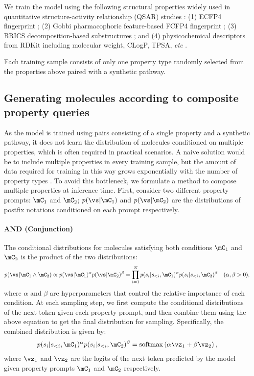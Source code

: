 We train the model using the following structural properties widely used in quantitative structure-activity relationship (QSAR) studies \citep{roy2015qsarbook}:
(1) ECFP4 fingerprint \citep{rogers2010extended};
(2) Gobbi pharmacophoric feature-based FCFP4 fingerprint \citep{gobbi1998genetic};
(3) BRICS decomposition-based substructures \citep{degen2008art}; and
(4) physicochemical descriptors from RDKit including molecular weight, CLogP, TPSA, \textit{etc} \citep{rdkit}.

Each training sample consists of only one property type randomly selected from the properties above paired with a synthetic pathway.


\subsection{Generating molecules according to composite property queries}
\label{sec:method:sampling}

As the model is trained using pairs consisting of a single property and a synthetic pathway, it does not learn the distribution of molecules conditioned on multiple properties, which is often required in practical scenarios.
A naive solution would be to include multiple properties in every training sample, but the amount of data required for training in this way grows exponentially with the number of property types \citep{du2024position}.
To avoid this bottleneck, we formulate a method to compose multiple properties at inference time.
First, consider two different property prompts: $\mC_1$ and $\mC_2$; $p(\vs | \mC_1)$ and $p(\vs | \mC_2)$ are the distributions of postfix notations conditioned on each prompt respectively.

\paragraph{AND (Conjunction)}
The conditional distributions for molecules satisfying both conditions $\mC_1$ and $\mC_2$ is the product of the two distributions:
\begin{equation}
\label{eq:and}
    p(\vs | \mC_1 \land \mC_2) \propto p(\vs | \mC_1)^\alpha  p(\vs | \mC_2)^\beta = \prod_{i=1}^{N}  p(s_i | s_{<i}, \mC_1)^\alpha  p(s_i | s_{<i}, \mC_2)^\beta \quad (\alpha, \beta > 0),
\end{equation}
where $\alpha$ and $\beta$ are hyperparameters that control the relative importance of each condition.
At each sampling step, we first compute the conditional distributions of the next token given each property prompt, and then combine them using the above equation to get the final distribution for sampling. Specifically, the combined distribution is given by:
\begin{equation}
\label{eq:and_logits}
    p(s_i | s_{<i}, \mC_1)^\alpha  p(s_i | s_{<i}, \mC_2)^\beta = \operatorname{softmax}\left( \alpha \vz_1 + \beta \vz_2 \right),
\end{equation}
where $\vz_1$ and $\vz_2$ are the logits of the next token predicted by the model given property prompts $\mC_1$ and $\mC_2$ respectively.

